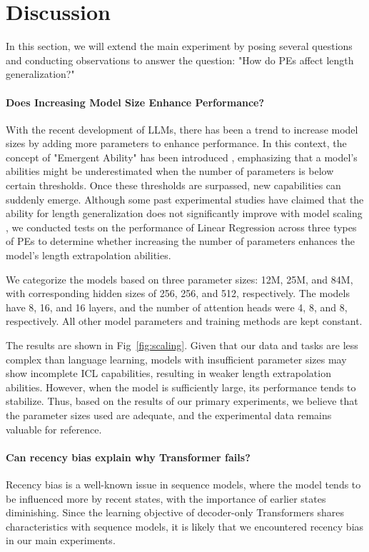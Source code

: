 \documentclass[letterpaper]{article} %
\begin{document}
\section{Discussion}
In this section, we will extend the main experiment
by posing several questions and conducting observations to answer the question: "How do PEs affect length generalization?"

\paragraph{Does Increasing Model Size Enhance Performance?}
With the recent development of LLMs, there has been a trend to increase model sizes by adding more parameters to enhance performance. In this context, the concept of "Emergent Ability" has been introduced \cite{wei-2022-emergent}, emphasizing that a model's abilities might be underestimated when the number of parameters is below certain thresholds. Once these thresholds are surpassed, new capabilities can suddenly emerge. Although some past experimental studies have claimed that the ability for length generalization does not significantly improve with model scaling \cite{anil-2022-exploring, zhou-2024-transformers}, we conducted tests on the performance of Linear Regression across three types of PEs to determine whether increasing the number of parameters enhances the model's length extrapolation abilities.

We categorize the models based on three parameter sizes: 12M, 25M, and 84M, with corresponding hidden sizes of 256, 256, and 512, respectively. The models have 8, 16, and 16 layers, and the number of attention heads were 4, 8, and 8, respectively. All other model parameters and training methods are kept constant. 

The results are shown in Fig~\ref{fig:scaling}. Given that our data and tasks are less complex than language learning, models with insufficient parameter sizes may show incomplete ICL capabilities, resulting in weaker length extrapolation abilities. However, when the model is sufficiently large, its performance tends to stabilize. Thus, based on the results of our primary experiments, we believe that the parameter sizes used are adequate, and the experimental data remains valuable for reference.


\paragraph{Can recency bias explain why Transformer fails?}
Recency bias is a well-known issue in sequence models, where the model tends to be influenced more by recent states, with the importance of earlier states diminishing. Since the learning objective of decoder-only Transformers shares characteristics with sequence models, it is likely that we encountered recency bias in our main experiments.
\end{document}
